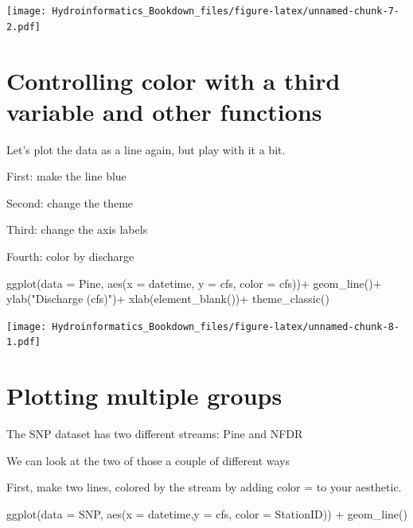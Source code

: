 \documentclass[
]{book}
\newenvironment{Shaded}{\begin{snugshade}}{\end{snugshade}}
\newcommand{\AttributeTok}[1]{\textcolor[rgb]{0.77,0.63,0.00}{#1}}
\newcommand{\FunctionTok}[1]{\textcolor[rgb]{0.00,0.00,0.00}{#1}}
\newcommand{\NormalTok}[1]{#1}
\newcommand{\SpecialCharTok}[1]{\textcolor[rgb]{0.00,0.00,0.00}{#1}}
\newcommand{\StringTok}[1]{\textcolor[rgb]{0.31,0.60,0.02}{#1}}
\begin{document}
\texttt{[image: Hydroinformatics\_Bookdown\_files/figure-latex/unnamed-chunk-7-2.pdf]}

\hypertarget{controlling-color-with-a-third-variable-and-other-functions}{%
\section{Controlling color with a third variable and other functions}\label{controlling-color-with-a-third-variable-and-other-functions}}

Let's plot the data as a line again, but play with it a bit.

First: make the line blue

Second: change the theme

Third: change the axis labels

Fourth: color by discharge

\begin{Shaded}
\begin{Highlighting}[]
\FunctionTok{ggplot}\NormalTok{(}\AttributeTok{data =}\NormalTok{ Pine, }\FunctionTok{aes}\NormalTok{(}\AttributeTok{x =}\NormalTok{ datetime, }\AttributeTok{y =}\NormalTok{ cfs, }\AttributeTok{color =}\NormalTok{ cfs))}\SpecialCharTok{+}
  \FunctionTok{geom\_line}\NormalTok{()}\SpecialCharTok{+}
  \FunctionTok{ylab}\NormalTok{(}\StringTok{"Discharge (cfs)"}\NormalTok{)}\SpecialCharTok{+}
  \FunctionTok{xlab}\NormalTok{(}\FunctionTok{element\_blank}\NormalTok{())}\SpecialCharTok{+}
  \FunctionTok{theme\_classic}\NormalTok{()}
\end{Highlighting}
\end{Shaded}

\texttt{[image: Hydroinformatics\_Bookdown\_files/figure-latex/unnamed-chunk-8-1.pdf]}

\hypertarget{plotting-multiple-groups}{%
\section{Plotting multiple groups}\label{plotting-multiple-groups}}

The SNP dataset has two different streams: Pine and NFDR

We can look at the two of those a couple of different ways

First, make two lines, colored by the stream by adding color = to your aesthetic.

\begin{Shaded}
\begin{Highlighting}[]
\FunctionTok{ggplot}\NormalTok{(}\AttributeTok{data =}\NormalTok{ SNP, }\FunctionTok{aes}\NormalTok{(}\AttributeTok{x =}\NormalTok{ datetime,}\AttributeTok{y =}\NormalTok{ cfs, }\AttributeTok{color =}\NormalTok{ StationID)) }\SpecialCharTok{+}
  \FunctionTok{geom\_line}\NormalTok{()}
\end{Highlighting}
\end{Shaded}
\end{document}

